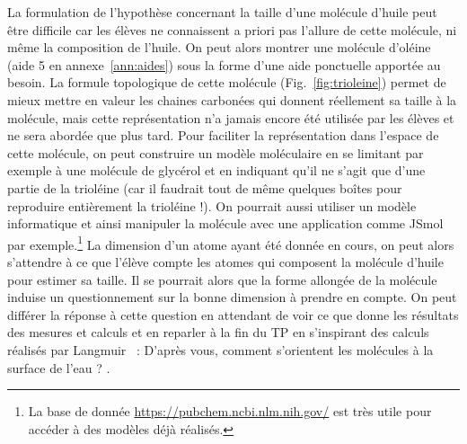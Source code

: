 \documentclass[12pt,a4paper]{article}
\begin{document}
La formulation de l'hypothèse concernant la taille d'une molécule d'huile peut être difficile car les élèves ne connaissent a priori pas l'allure de cette molécule, ni même la composition de l'huile.
On peut alors montrer une molécule d'oléine (aide 5 en annexe~\ref{ann:aides}) sous la forme d'une aide ponctuelle apportée au besoin.
La formule topologique de cette molécule (Fig.~\ref{fig:trioleine}) permet de mieux mettre en valeur les chaines carbonées qui donnent réellement sa taille à la molécule, mais cette représentation n'a jamais encore été utilisée par les élèves et ne sera abordée que plus tard.
Pour faciliter la représentation dans l'espace de cette molécule, on peut construire un modèle moléculaire en se limitant par exemple à une molécule de glycérol et en indiquant qu'il ne s'agit que d'une partie de la trioléine (car il faudrait tout de même quelques boîtes pour reproduire entièrement la trioléine !).
On pourrait aussi utiliser un modèle informatique et ainsi \og manipuler \fg{} la molécule avec une application comme JSmol par exemple.\footnote{La base de donnée \href{https://pubchem.ncbi.nlm.nih.gov/}{https://pubchem.ncbi.nlm.nih.gov/} est très utile pour accéder à des modèles déjà réalisés.}
La dimension d'un atome ayant été donnée en cours, on peut alors s'attendre à ce que l'élève compte les atomes qui composent la \og molécule d'huile \fg{} pour estimer sa taille.
Il se pourrait alors que la forme allongée de la molécule induise un questionnement sur la bonne dimension à prendre en compte.
On peut différer la réponse à cette question en attendant de voir ce que donne les résultats des mesures et calculs et en reparler à la fin du TP en s'inspirant des calculs réalisés par Langmuir~\cite{Langmuir1917} : \og D'après vous, comment s'orientent les molécules à la surface de l'eau ? \fg{}.
\end{document}

